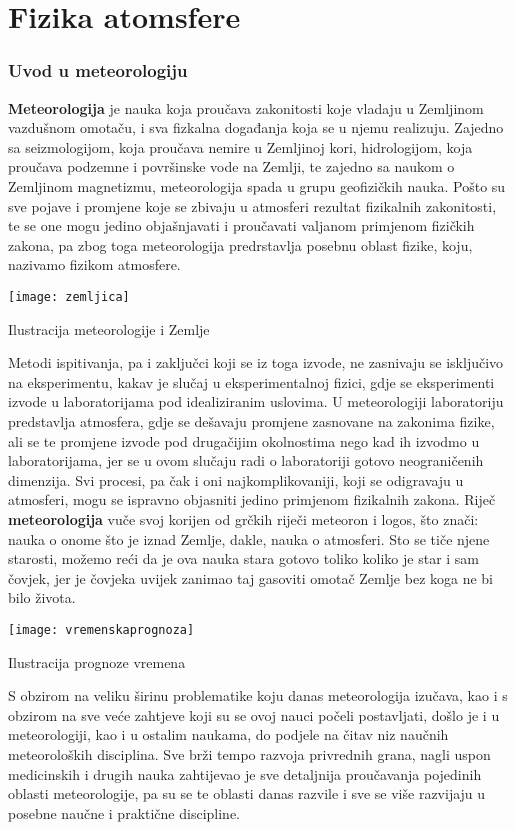 \chapter{Fizika atomsfere}
\subsection{Uvod u meteorologiju}
\textbf{Meteorologija} je nauka koja proučava zakonitosti koje vladaju u Zemljinom vazdušnom omotaču, i sva fizkalna događanja koja se u njemu realizuju. Zajedno sa seizmologijom, koja proučava nemire u Zemljinoj kori, hidrologijom, koja proučava podzemne i površinske vode na Zemlji, te zajedno sa naukom o Zemljinom magnetizmu, meteorologija spada u grupu geofizičkih nauka. Pošto su sve pojave i promjene  koje se zbivaju u atmosferi rezultat fizikalnih zakonitosti, te se one mogu jedino objašnjavati i proučavati valjanom primjenom fizičkih zakona, pa zbog toga meteorologija predrstavlja posebnu oblast  fizike, koju, nazivamo fizikom atmosfere.
	\begin{marginfigure}%
	\texttt{[image: zemljica]}
	\caption{Ilustracija meteorologije i Zemlje}
	\label{fig:zemljica}
	\end{marginfigure} 
Metodi ispitivanja, pa i zaključci koji se iz toga izvode, ne zasnivaju se isključivo na eksperimentu, kakav je slučaj u eksperimentalnoj fizici, gdje se eksperimenti izvode u laboratorijama pod idealiziranim uslovima. U meteorologiji laboratoriju predstavlja atmosfera, gdje se dešavaju promjene zasnovane na zakonima fizike, ali se te promjene izvode pod drugačijim okolnostima nego kad ih izvodmo u laboratorijama, jer se u ovom slučaju radi o laboratoriji gotovo neograničenih dimenzija. Svi procesi, pa čak i oni najkomplikovaniji, koji se odigravaju u atmosferi, mogu se ispravno objasniti jedino primjenom fizikalnih zakona.
Riječ \textbf{meteorologija} vuče svoj korijen od grčkih riječi meteoron i logos, što znači: nauka o onome što je iznad Zemlje, dakle, nauka o atmosferi. Sto se tiče njene starosti, možemo reći da je ova nauka stara gotovo toliko koliko je star i sam čovjek, jer je čovjeka uvijek zanimao taj gasoviti omotač Zemlje bez koga ne bi bilo života. 
	\begin{marginfigure}%
	\texttt{[image: vremenskaprognoza]}
	\caption{Ilustracija prognoze vremena}
	\label{fig:vremenska}
	\end{marginfigure} 
S obzirom na veliku širinu problematike koju danas meteorologija izučava, kao i s obzirom na sve veće zahtjeve koji su se ovoj nauci počeli postavljati, došlo je i u meteorologiji, kao i u ostalim naukama, do podjele na čitav niz naučnih meteoroloških disciplina. Sve brži tempo razvoja privrednih grana, nagli uspon medicinskih i drugih nauka zahtijevao je sve detaljnija proučavanja pojedinih oblasti meteorologije, pa su se te oblasti danas razvile i sve se više razvijaju u posebne naučne i praktične discipline.

